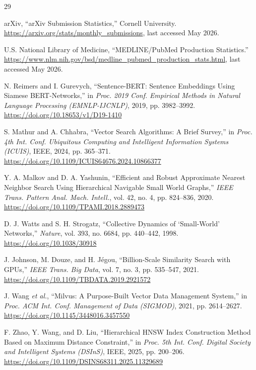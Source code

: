 \documentclass[runningheads]{llncs}
\begin{document}
\begin{thebibliography}{29}

arXiv, ``arXiv Submission Statistics,'' Cornell University.\\
\url{https://arxiv.org/stats/monthly_submissions}, last accessed May 2026.

U.S. National Library of Medicine, ``MEDLINE/PubMed Production Statistics.''\\
\url{https://www.nlm.nih.gov/bsd/medline_pubmed_production_stats.html},
last accessed May 2026.

N. Reimers and I. Gurevych, ``Sentence-BERT: Sentence Embeddings Using Siamese
BERT-Networks,'' in \textit{Proc. 2019 Conf. Empirical Methods in Natural Language
Processing (EMNLP-IJCNLP)}, 2019, pp. 3982--3992.\\
\url{https://doi.org/10.18653/v1/D19-1410}

S. Mathur and A. Chhabra, ``Vector Search Algorithms: A Brief Survey,'' in
\textit{Proc. 4th Int. Conf. Ubiquitous Computing and Intelligent Information Systems
(ICUIS)}, IEEE, 2024, pp. 365--371.\\
\url{https://doi.org/10.1109/ICUIS64676.2024.10866377}

Y. A. Malkov and D. A. Yashunin, ``Efficient and Robust Approximate Nearest
Neighbor Search Using Hierarchical Navigable Small World Graphs,'' \textit{IEEE
Trans. Pattern Anal. Mach. Intell.}, vol. 42, no. 4, pp. 824--836, 2020.\\
\url{https://doi.org/10.1109/TPAMI.2018.2889473}

D. J. Watts and S. H. Strogatz, ``Collective Dynamics of `Small-World' Networks,''
\textit{Nature}, vol. 393, no. 6684, pp. 440--442, 1998.\\
\url{https://doi.org/10.1038/30918}

J. Johnson, M. Douze, and H. J\'egou, ``Billion-Scale Similarity Search with
GPUs,'' \textit{IEEE Trans. Big Data}, vol. 7, no. 3, pp. 535--547, 2021.\\
\url{https://doi.org/10.1109/TBDATA.2019.2921572}

J. Wang \textit{et al.}, ``Milvus: A Purpose-Built Vector Data Management System,''
in \textit{Proc. ACM Int. Conf. Management of Data (SIGMOD)}, 2021,
pp. 2614--2627.\\
\url{https://doi.org/10.1145/3448016.3457550}

F. Zhao, Y. Wang, and D. Liu, ``Hierarchical HNSW Index Construction Method Based
on Maximum Distance Constraint,'' in \textit{Proc. 5th Int. Conf. Digital Society
and Intelligent Systems (DSInS)}, IEEE, 2025, pp. 200--206.\\
\url{https://doi.org/10.1109/DSINS68311.2025.11329689}


\end{thebibliography}
\end{document}
